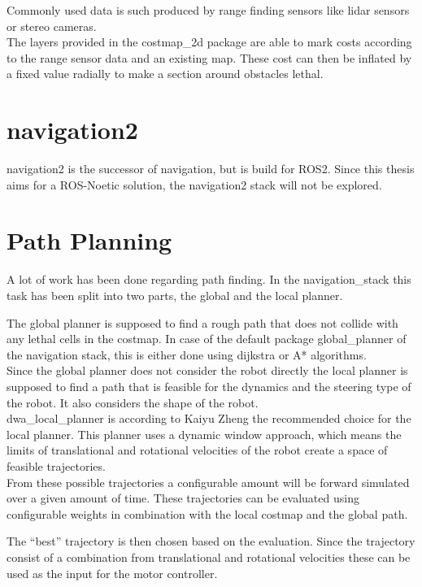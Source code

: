 Commonly used data is such produced by range finding sensors like lidar sensors or stereo cameras.\\

The layers provided in the costmap\_2d package are able to mark costs according to the range sensor data and an existing map. These cost can then be inflated by a fixed value radially\cite{costmap} to make a section around obstacles lethal.
\section{navigation2}

navigation2 is the successor of navigation, but is build for ROS2.
Since this thesis aims for a ROS-Noetic solution, the navigation2 stack will not be explored.

\section{Path Planning}

A lot of work has been done regarding path finding. In the navigation\_stack this task has been split into two parts, the global and the local planner.

The global planner is supposed to find a rough path that does not collide with any lethal cells in the costmap. In case of the default package global\_planner of the navigation stack, this is either done using dijkstra or A* algorithms.\\

Since the global planner does not consider the robot directly the local planner is supposed to find a path that is feasible for the dynamics and the steering type of the robot. It also considers the shape of the robot\cite{movebase}.\\



dwa\_local\_planner is according to Kaiyu Zheng the recommended choice for the local planner\cite{navtuningguide}. This planner uses a dynamic window approach, which means the limits of translational and rotational velocities of the robot create a space of feasible trajectories.\\ 
From these possible trajectories a configurable amount will be forward simulated over a given amount of time. These trajectories can be evaluated using configurable weights in combination with the local costmap and the global path.

The ``best'' trajectory is then chosen based on the evaluation. Since the trajectory consist of a combination from translational and rotational velocities these can be used as the input for the motor controller\cite{dwaplanner}.\\

